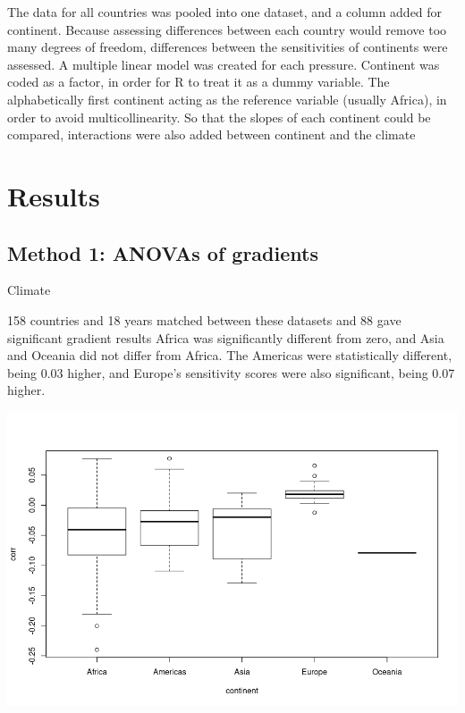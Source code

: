\documentclass[11pt, a4paper, titlepage]{article}
\begin{document}
The data for all countries was pooled into one dataset, and a column added for continent. Because assessing differences between each country would remove too many degrees of freedom, differences between the sensitivities of continents were assessed. A multiple linear model was created for each pressure. Continent was coded as a factor, in order for R to treat it as a dummy variable. The alphabetically first continent acting as the reference variable (usually Africa), in order to avoid multicollinearity. So that the slopes of each continent could be compared, interactions were also added between continent and the climate \newline


	

	
	
	
		
	 
	
	
	

	\clearpage

	\section*{Results}
	 
	\subsection*{Method 1: ANOVAs of gradients}
	
	Climate \newline
	
	158 countries and 18 years matched between these datasets and 88 gave significant gradient results \newline
	Africa was significantly different from zero, and Asia and Oceania did not differ from Africa. The Americas were statistically different, being 0.03 higher, and Europe's sensitivity scores were also significant, being 0.07 higher. 
	
	\includegraphics[scale=0.75]{images/SensitivityScoresClimate.png}
	
\end{document}
